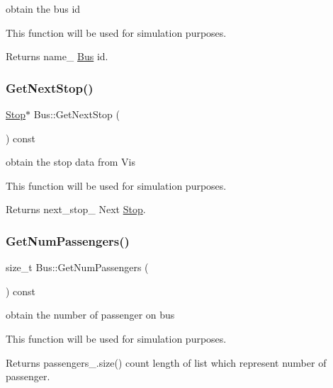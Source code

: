 obtain the bus id 

This function will be used for simulation purposes.

\begin{DoxyReturn}{Returns}
name\+\_\+ \hyperlink{classBus}{Bus} id. 
\end{DoxyReturn}
\mbox{\label{classBus_a6068e9801c6da152f05e40eb26e80b02}} 
\subsubsection{\texorpdfstring{Get\+Next\+Stop()}{GetNextStop()}}
{\footnotesize\ttfamily \hyperlink{classStop}{Stop}$\ast$ Bus\+::\+Get\+Next\+Stop (\begin{DoxyParamCaption}{ }\end{DoxyParamCaption}) const\hspace{0.3cm}{\ttfamily [inline]}}



obtain the stop data from Vis 

This function will be used for simulation purposes.

\begin{DoxyReturn}{Returns}
next\+\_\+stop\+\_\+ Next \hyperlink{classStop}{Stop}. 
\end{DoxyReturn}
\mbox{\label{classBus_a346aaa56030d4707886e1db8181e8b55}} 
\subsubsection{\texorpdfstring{Get\+Num\+Passengers()}{GetNumPassengers()}}
{\footnotesize\ttfamily size\+\_\+t Bus\+::\+Get\+Num\+Passengers (\begin{DoxyParamCaption}{ }\end{DoxyParamCaption}) const\hspace{0.3cm}{\ttfamily [inline]}}



obtain the number of passenger on bus 

This function will be used for simulation purposes.

\begin{DoxyReturn}{Returns}
passengers\+\_\+.\+size() count length of list which represent number of passenger. 
\end{DoxyReturn}
\mbox{\label{classBus_a9c64b0801bf589f121fb0598b70a99b4}} 
